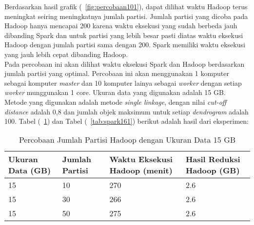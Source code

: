 Berdasarkan hasil grafik (~\ref{fig:percobaan101}), dapat dilihat waktu Hadoop terus meningkat seiring meningkatnya jumlah partisi. Jumlah partisi yang dicoba pada Hadoop hanya mencapai 200 karena waktu eksekusi yang sudah berbeda jauh dibanding Spark dan untuk partisi yang lebih besar pasti diatas waktu eksekusi Hadoop dengan jumlah partisi sama dengan 200. Spark memiliki waktu eksekusi yang jauh lebih cepat dibanding Hadoop.  \\





Pada percobaan ini akan dilihat waktu eksekusi Spark dan Hadoop berdasarkan jumlah partisi yang optimal. Percobaan ini akan menggunakan 1 komputer sebagai komputer \textit{master} dan 10 komputer lainya sebagai \textit{worker} dengan setiap \textit{worker} munggunakan 1 core. Ukuran data yang digunakan adalah 15 GB. Metode yang digunakan adalah metode \textit{single linkage}, dengan nilai \textit{cut-off distance} adalah 0,8 dan jumlah objek maksimum untuk setiap \textit{dendrogram} adalah 100. Tabel (~\ref{tab:spark151}) dan Tabel (~\ref{tab:spark161}) berikut adalah hasil dari eksperimen:





\begin{table}[H] 
	\centering 
	\caption{Percobaan Jumlah Partisi Hadoop dengan Ukuran Data 15 GB}
	\label{tab:spark151}
	\begin{tabular}{|p{3cm}|p{3cm}|p{4cm}|p{4cm}|}
\hline
Ukuran Data (GB) & Jumlah Partisi &  Waktu Eksekusi Hadoop (menit) & Hasil Reduksi Hadoop (GB)\\
\hline
15 & 10 & 270  & 2.6  \\
\hline
15 & 30 & 266  & 2.6  \\
\hline
15 & 50 & 275  & 2.6  \\
\hline


\hline

	\end{tabular} 
\end{table}




